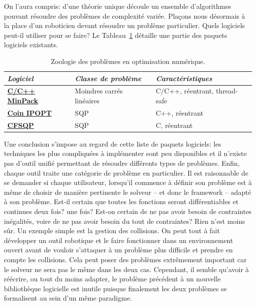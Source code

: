 On l'aura compris: d'une théorie unique découle un ensemble
d'algorithmes pouvant résoudre des problèmes de complexité
variée. Plaçons nous désormais à la place d'un roboticien devant
résoudre un problème particulier. Quels logiciels peut-il utiliser
pour se faire? Le Tableau~\ref{tbl:chap1_soft} détaille une partie
des paquets logiciels existants.
%
\begin{table}\label{tbl:chap1_soft}
\begin{center}
\begin{tabular}{|p{}|p{}|p{}|}
\hline
\textit{Logiciel} & \textit{Classe de problème} & \textit{Caractéristiques}\\
\hline
\textbf{\href{http://devernay.free.fr/hacks/cminpack/index.html}{C/C++ MinPack}} & Moindres carrés linéaires & C/C++, réentrant, thread-safe \\
\hline
\textbf{\href{https://projects.coin-or.org/Ipopt}{Coin IPOPT}} & SQP & C++, réentrant \\
\hline
\textbf{\href{http://www.aemdesign.com/}{CFSQP}} & SQP & C, réentrant \\
\hline
\end{tabular}
\end{center}
\caption{Zoologie des problèmes en optimisation numérique.}
\end{table}
%
Une conclusion s'impose au regard de cette liste de paquets logiciels:
les techniques les plus compliquées à implémenter sont peu disponibles
et il n'existe pas d'outil unifié permettant de résoudre différents
types de problèmes. Enfin, chaque outil traite une catégorie de
problème en particulier. Il est raisonnable de se demander si chaque
utilisateur, lorsqu'il commence à définir son problème est à même de
choisir de manière pertinente le solveur -- et donc le framework --
adapté à son problème. Est-il certain que toutes les fonctions seront
différentiables et continues deux fois? une fois? Est-on certain de ne
pas avoir besoin de contraintes inégalités, voire de ne pas avoir
besoin du tout de contraintes? Rien n'est moins sûr. Un exemple simple
est la gestion des collisions. On peut tout à fait développer un outil
robotique et le faire fonctionner dans un environnement ouvert avant
de vouloir s'attaquer à un problème plus difficile et prendre en
compte les collisions. Cela peut poser des problèmes extrêmement
important car le solveur ne sera pas le même dans les deux
cas. Cependant, il semble qu'avoir à réécrire, ou tout du moins
adapter, le problème précédent à un nouvelle bibliothèque logicielle
est inutile puisque finalement les deux problèmes se formalisent au
sein d'un même paradigme.


